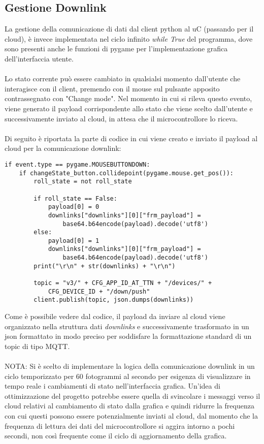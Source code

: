 \subsection{Gestione Downlink}
La gestione della comunicazione di dati dal client python al uC (passando per il cloud), è invece implementata nel ciclo infinito \textit{while True} 
del programma, dove sono presenti anche le funzioni di pygame per l'implementazione grafica dell'interfaccia utente.
\\\\Lo stato corrente può essere cambiato in qualsialsi momento dall'utente che interagisce con il client, premendo con il mouse sul pulsante
apposito contrassegnato con "Change mode". Nel momento in cui si rileva questo evento, viene generato il payload corrispondente allo stato che viene 
scelto dall'utente e successivamente inviato al cloud, in attesa che il microcontrollore lo riceva.
\\\\Di seguito è riportata la parte di codice in cui viene creato e inviato il payload al cloud per la comunicazione downlink:
\begin{verbatim}
if event.type == pygame.MOUSEBUTTONDOWN:
    if changeState_button.collidepoint(pygame.mouse.get_pos()):
        roll_state = not roll_state

        if roll_state == False:
            payload[0] = 0
            downlinks["downlinks"][0]["frm_payload"] = 
                base64.b64encode(payload).decode('utf8')
        else:
            payload[0] = 1
            downlinks["downlinks"][0]["frm_payload"] = 
                base64.b64encode(payload).decode('utf8')
        print("\r\n" + str(downlinks) + "\r\n")

        topic = "v3/" + CFG_APP_ID_AT_TTN + "/devices/" + 
            CFG_DEVICE_ID + "/down/push"
        client.publish(topic, json.dumps(downlinks))
\end{verbatim}
Come è possibile vedere dal codice, il payload da inviare al cloud viene organizzato nella struttura dati \textit{downlinks} e successivamente trasformato in un json
formattato in modo preciso per soddisfare la formattazione standard di un topic di tipo MQTT.\\\\
NOTA: Si è scelto di implementare la logica della comunicazione downlink in un ciclo temporizzato per 60 fotogrammi al secondo per esigenza di 
visualizzare in tempo reale i cambiamenti di stato nell'interfaccia grafica. Un'idea di ottimizzazione del progetto potrebbe essere
quella di svincolare i messaggi verso il cloud relativi al cambiamento di stato dalla grafica e quindi ridurre la frequenza con cui questi possono essere potenzialmente
inviati al cloud, dal momento che la frequenza di lettura dei dati del microcontrollore si aggira intorno a pochi secondi, non così frequente come il ciclo di aggiornamento della grafica.


